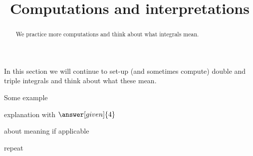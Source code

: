 \documentclass{ximera}
\title[Dig-In:]{Computations and interpretations}
\begin{document}
\begin{abstract}
  We practice more computations and think about what integrals mean.
\end{abstract}
\maketitle

In this section we will continue to set-up (and sometimes compute)
double and triple integrals and think about what these mean.


\begin{example}
  Some example
  \begin{explanation}
    explanation with $\answer[given]{4}$
  \end{explanation}
\end{example}

\begin{question}
  about meaning if applicable
\end{question}

repeat
\end{document}
